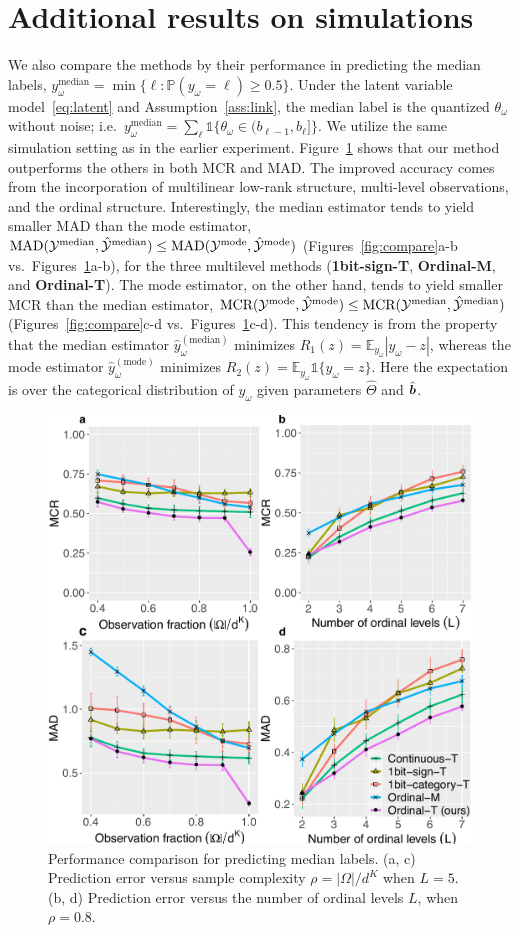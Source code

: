 \documentclass{article}
\theoremstyle{plain}
\theoremstyle{definition}
\begin{document}
\section{Additional results on simulations}
We also compare the methods by their performance in predicting the median labels, $y_\omega^{\text{median}}=\min\{\ell\colon\mathbb{P}(y_\omega=\ell)\geq 0.5\}$. Under the latent variable model~\eqref{eq:latent} and Assumption~\ref{ass:link}, the median label is the quantized $\theta_\omega$ without noise; i.e.\ $y_\omega^{\text{median}}=\sum_\ell \mathds{1}\{\theta_\omega\in(b_{\ell-1},b_\ell]\}$.
 We utilize the same simulation setting as in the earlier experiment. Figure~\ref{fig:compare2} shows that our method outperforms the others in both MCR and MAD. The improved accuracy comes from the incorporation of multilinear low-rank structure, multi-level observations, and the ordinal structure. Interestingly, the median estimator tends to yield smaller MAD than the mode estimator, $\text{MAD}(\mathcal{Y}^{\text{median}}, \hat {\mathcal{Y}}^{\text{median}})\leq \text{MAD}(\mathcal{Y}^{\text{mode}}, \hat {\mathcal{Y}}^{\text{mode}})$  (Figures~\ref{fig:compare}a-b vs.\ Figures~\ref{fig:compare2}a-b), for the three multilevel methods ({\bf 1bit-sign-T}, {\bf Ordinal-M}, and {\bf Ordinal-T}). The mode estimator, on the other hand, tends to yield smaller MCR than the median estimator, $\text{MCR}(\mathcal{Y}^{\text{mode}}, \hat {\mathcal{Y}}^{\text{mode}})\leq\text{MCR}(\mathcal{Y}^{\text{median}}, \hat {\mathcal{Y}}^{\text{median}})$ (Figures~\ref{fig:compare}c-d vs.\ Figures~\ref{fig:compare2}c-d). This tendency is from the property that the median estimator $\hat y^{(\text{median})}_\omega$ minimizes $R_1(z)=\mathbb{E}_{y_\omega}|y_\omega-z|$, whereas the mode estimator $\hat y^{(\text{mode})}_\omega $ minimizes $R_2(z)=\mathbb{E}_{y_\omega}\mathds{1}\{y_\omega=z\}$. Here the expectation is over the categorical distribution of $y_\omega$ given parameters $\hat \Theta$ and $\hat {\bm{b}}$.

\begin{figure}[ht]
\begin{center}
\includegraphics[width=.55\textwidth]{panel3.pdf}
\end{center}
\caption{Performance comparison for predicting median labels. (a, c) Prediction error versus sample complexity $\rho=|\Omega|/d^K$ when $L=5$. (b, d) Prediction error versus the number of ordinal levels $L$, when $\rho=0.8.$}\label{fig:compare2}
\end{figure}
\end{document}
